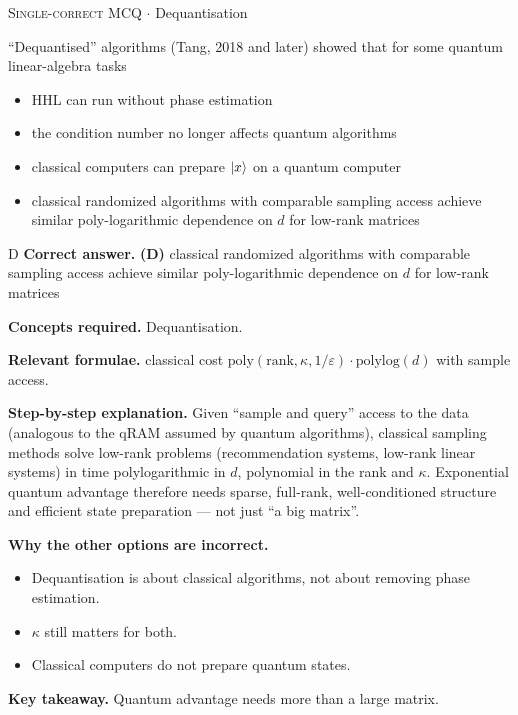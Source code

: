 \documentclass[11pt,a4paper]{article}
\newcommand{\optlabel}[1]{\textbf{(#1)}}
\newcommand{\correctlabel}[1]{\textcolor{okgreen}{\textbf{(#1)}\,\ding{51}}}
\newenvironment{qitem}[1]{\begin{list}{}{\setlength{\leftmargin}{3.3em}\setlength{\labelwidth}{3.1em}%
  \setlength{\labelsep}{0.2em}\setlength{\topsep}{3pt}\setlength{\parsep}{3pt}}\item[\textbf{Q.#1}\hfill]}{\end{list}}
\newcommand{\qsep}{\par\vspace{2pt}{\color{black!15}\hrule}\vspace{4pt}}
\newcommand{\qmeta}[2]{{\footnotesize\color{black!60}\textsc{#1} \;$\cdot$\; #2}\par}
\begin{document}
\begin{qitem}{68}
\qmeta{Single-correct MCQ}{Dequantisation}
``Dequantised'' algorithms (Tang, 2018 and later) showed that for some quantum linear-algebra tasks
\begin{itemize}[leftmargin=2.6em, labelsep=0.4em, itemsep=2pt, topsep=3pt]
\item[\optlabel{A}] HHL can run without phase estimation
\item[\optlabel{B}] the condition number no longer affects quantum algorithms
\item[\optlabel{C}] classical computers can prepare $\ket x$ on a quantum computer
\item[\correctlabel{D}] classical randomized algorithms with comparable sampling access achieve similar poly-logarithmic dependence on $d$ for low-rank matrices
\end{itemize}
\end{qitem}
\begin{solbox}{D}
\textbf{\color{brand}Correct answer.} \textcolor{okgreen}{\textbf{(D)}} classical randomized algorithms with comparable sampling access achieve similar poly-logarithmic dependence on $d$ for low-rank matrices

\textbf{\color{brand}Concepts required.} Dequantisation.

\textbf{\color{brand}Relevant formulae.} classical cost $\mathrm{poly}(\text{rank}, \kappa, 1/\varepsilon)\cdot\mathrm{polylog}(d)$ with sample access.

\textbf{\color{brand}Step-by-step explanation.} Given ``sample and query'' access to the data (analogous to the qRAM assumed by quantum algorithms), classical sampling methods solve low-rank problems (recommendation systems,
low-rank linear systems) in time polylogarithmic in $d$, polynomial in the rank and $\kappa$. Exponential quantum advantage therefore needs sparse, full-rank, well-conditioned structure and
efficient state preparation --- not just ``a big matrix''.

\textbf{\color{brand}Why the other options are incorrect.}
\begin{itemize}[leftmargin=2.4em, itemsep=1pt, topsep=2pt]
\item[\textbf{(A)}] Dequantisation is about classical algorithms, not about removing phase estimation.
\item[\textbf{(B)}] $\kappa$ still matters for both.
\item[\textbf{(C)}] Classical computers do not prepare quantum states.
\end{itemize}
\textbf{\color{brand}Key takeaway.} Quantum advantage needs more than a large matrix.
\end{solbox}
\qsep
\end{document}
